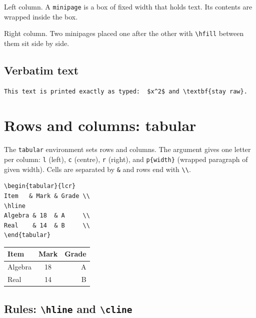 \documentclass[11pt,a4paper]{article}
\begin{document}
\noindent
\begin{minipage}[t]{0.45\textwidth}
  Left column. A \texttt{minipage} is a box of fixed width that
  holds text. Its contents are wrapped inside the box.
\end{minipage}
\hfill
\begin{minipage}[t]{0.45\textwidth}
  Right column. Two minipages placed one after the other with
  \verb|\hfill| between them sit side by side.
\end{minipage}

\subsection{Verbatim text}

\begin{verbatim}
This text is printed exactly as typed:  $x^2$ and \textbf{stay raw}.
\end{verbatim}

\section{Rows and columns: tabular}

The \texttt{tabular} environment sets rows and columns. The argument
gives one letter per column: \texttt{l} (left), \texttt{c} (centre),
\texttt{r} (right), and \texttt{p\{width\}} (wrapped paragraph of
given width). Cells are separated by \verb|&| and rows end with
\verb|\\|.

\begin{verbatim}
\begin{tabular}{lcr}
Item   & Mark & Grade \\
\hline
Algebra & 18  & A     \\
Real    & 14  & B     \\
\end{tabular}
\end{verbatim}

\begin{tabular}{lcr}
Item    & Mark & Grade \\
\hline
Algebra & 18   & A     \\
Real    & 14   & B     \\
\end{tabular}

\subsection{Rules: \texttt{\textbackslash hline} and \texttt{\textbackslash cline}}
\end{document}
